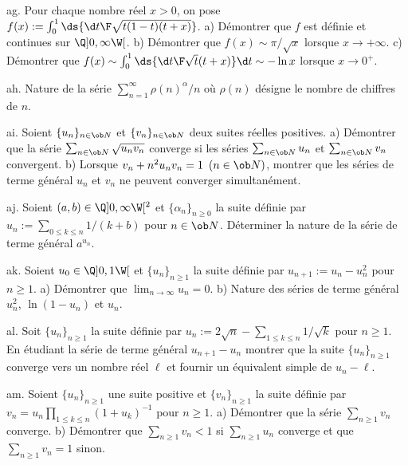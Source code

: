 \exo [Level=2,Fight=4,Learn=3,Field=\FonctionsDéfiniesParUneIntégrale,Type=\Colles,Origin=\MP] ag. 
Pour chaque nombre réel $x>0$, on pose $f(x):=\int_0^1\ds{\d t\F\sqrt{t(1-t)(t+x)}}$. \pn
a) Démontrer que $f$ est définie et continues sur $\Q]0,\infty\W[$. \pn
b) Démontrer que $f(x)\sim \pi/\sqrt x$ lorsque $x\to+\infty$. \pn
c) Démontrer que $f(x)\sim\int_0^1\ds{\d t\F\sqrt t(t+x)}\d t\sim-\ln x$ lorsque $x\to0^+$. 

\exo [Level=2,Fight=2,Learn=1,Field=\Séries,Type=\Colles,Origin=\MP] ah. 
Nature de la série $\sum_{n=1}^\infty\rho(n)^\alpha/n$ où $\rho(n)$ désigne le nombre de chiffres de $n$. 

\exo [Level=2,Fight=2,Learn=1,Field=\Séries,Type=\Colles,Origin=\MP] ai. 
Soient $\{u_n\}_{n\in\ob N}$ et $\{v_n\}_{n\in\ob N}$ deux suites réelles positives. \pn
a) Démontrer que la série $\sum_{n\in\ob N}\sqrt{u_nv_n}$ converge 
si les séries $\sum_{n\in\ob N}u_n$ et $\sum_{n\in\ob N}v_n$ convergent. \pn
b) Lorsque $v_n+n^2u_nv_n=1\ \,(n\in\ob N)$, montrer que les séries de terme général $u_n$ et $v_n$ ne peuvent converger simultanément. 

\exo [Level=2,Fight=3,Learn=1,Field=\Séries,Type=\Colles,Origin=\MP] aj. 
Soient $(a,b)\in\Q]0,\infty\W[^2$ et $\{\alpha_n\}_{n\ge0}$ 
la suite définie par $u_n:=\sum_{0\le k\le n}1/(k+b)$ pour $n\in\ob N$. \pn 
Déterminer la nature de la série de terme général $a^{u_n}$. 

\exo [Level=2,Fight=2,Learn=3,Field=\Séries,Type=\TravauxDirigés,Origin=\MP] ak. 
Soient $u_0\in\Q]0,1\W[$ et $\{u_n\}_{n\ge1}$ la suite définie par $u_{n+1}:=u_n-u_n^2$ pour $n\ge1$. \pn
a) Démontrer que $\lim_{n\to\infty}u_n=0$. \pn
b) Nature des séries de terme général $u_n^2$, $\ln(1-u_n)$ et $u_n$. 
 
\exo [Level=2,Fight=1,Learn=1,Field=\Séries,Type=\Exercices,Origin=\MP] al. 
Soit $\{u_n\}_{n\ge1}$ la suite définie par $u_n:=2\sqrt n-\sum_{1\le k\le n}1/\sqrt k$ pour $n\ge1$. 
En étudiant la série de terme général $u_{n+1}-u_n$ montrer que la suite $\{u_n\}_{n\ge1}$ converge vers un nombre réel $\ell$ 
et fournir un équivalent simple de $u_n-\ell$. 

\exo [Level=2,Fight=2,Learn=2,Field=\Séries,Type=\Colles,Origin=\MP] am. 
Soient $\{u_n\}_{n\ge1}$ une suite positive et $\{v_n\}_{n\ge1}$ 
la suite définie par $v_n=u_n\prod_{1\le k\le n}(1+u_k)^{-1}$ pour $n\ge1$. \pn
a) Démontrer que la série $\sum_{n\ge1}v_n$ converge. \pn
b) Démontrer que $\sum_{n\ge1}v_n<1$ si $\sum_{n\ge1}u_n$ converge 
et que $\sum_{n\ge1}v_n=1$ sinon. 

